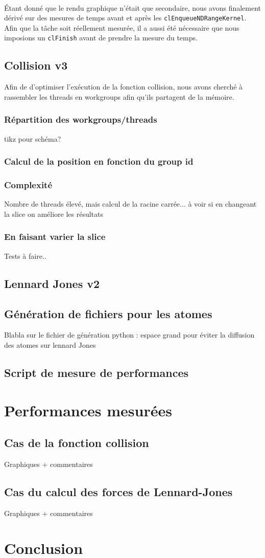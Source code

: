 \documentclass{article}
\begin{document}
\paragraph{}
Étant donné que le rendu graphique n'était que secondaire, nous avons finalement
dérivé sur des mesures de temps avant et après les
\verb!clEnqueueNDRangeKernel!. Afin que la tâche soit réellement mesurée, il
a aussi été nécessaire que nous imposions un \verb!clFinish! avant de prendre
la mesure du temps.

\subsection{Collision v3}
Afin de d'optimiser l'exécution de la fonction collision, nous avons cherché à
rassembler les threads en workgroups afin qu'ils partagent de la mémoire.
\subsubsection{Répartition des workgroups/threads}
tikz pour schéma?
\subsubsection{Calcul de la position en fonction du group id}
\subsubsection{Complexité}
Nombre de threads élevé, mais calcul de la racine carrée... à voir si en
changeant la slice on améliore les résultats
\subsubsection{En faisant varier la slice}
Tests à faire..

\subsection{Lennard Jones v2}

\subsection{Génération de fichiers pour les atomes}
Blabla sur le fichier de génération python : espace grand pour éviter la
diffusion des atomes sur lennard Jones

\subsection{Script de mesure de performances}

\section{Performances mesurées}

\subsection{Cas de la fonction collision}
Graphiques + commentaires
\subsection{Cas du calcul des forces de Lennard-Jones}
Graphiques + commentaires

\section{Conclusion}
\end{document}
